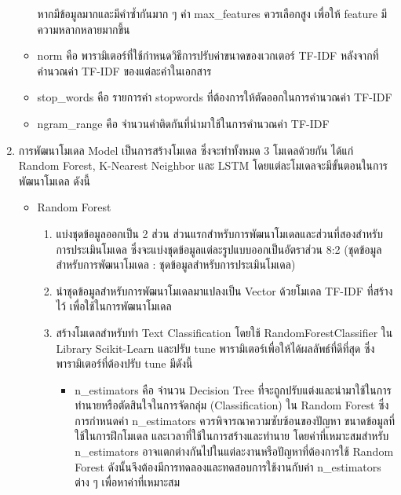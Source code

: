 \documentclass[12pt,oneside,openright,a4paper]{cpe-thai-project}
\begin{document}
\begin{enumerate}
\begin{itemize}
                  หากมีข้อมูลมากและมีคำซ้ำกันมาก ๆ ค่า max\_features ควรเลือกสูง เพื่อให้ feature มีความหลากหลายมากขึ้น
            \item norm คือ พารามิเตอร์ที่ใช้กำหนดวิธีการปรับค่าขนาดของเวกเตอร์ TF-IDF หลังจากที่คำนวณค่า TF-IDF ของแต่ละคำในเอกสาร
            \item stop\_words คือ รายการคำ stopwords ที่ต้องการให้ตัดออกในการคำนวณค่า TF-IDF
            \item ngram\_range คือ จำนวนคำติดกันที่นำมาใช้ในการคำนวณค่า TF-IDF
          \end{itemize}
    \item การพัฒนาโมเดล Model
          \newline\hspace*{1cm}เป็นการสร้างโมเดล ซึ่งจะทำทั้งหมด 3 โมเดลด้วยกัน ได้แก่ Random Forest, K-Nearest Neighbor และ LSTM
          โดยแต่ละโมเดลจะมีขั้นตอนในการพัฒนาโมเดล ดังนี้
          \begin{itemize}
            \item Random Forest
                  \begin{enumerate}
                    \item แบ่งชุดข้อมูลออกเป็น 2 ส่วน ส่วนแรกสำหรับการพัฒนาโมเดลและส่วนที่สองสำหรับการประเมินโมเดล 
                    ซึ่งจะแบ่งชุดข้อมูลแต่ละรูปแบบออกเป็นอัตราส่วน 8:2 (ชุดข้อมูลสำหรับการพัฒนาโมเดล : ชุดข้อมูลสำหรับการประเมินโมเดล) 
                    \item นำชุดข้อมูลสำหรับการพัฒนาโมเดลมาแปลงเป็น Vector ด้วยโมเดล TF-IDF ที่สร้างไว้ เพื่อใช้ในการพัฒนาโมเดล
                    \item สร้างโมเดลสำหรับทำ Text Classification โดยใช้ RandomForestClassifier ใน Library Scikit-Learn 
                          และปรับ tune พารามิเตอร์เพื่อให้ได้ผลลัพธ์ที่ดีที่สุด ซึ่งพารามิเตอร์ที่ต้องปรับ tune มีดังนี้
                          \begin{itemize}
                            \item n\_estimators คือ จำนวน Decision Tree ที่จะถูกปรับแต่งและนำมาใช้ในการทำนายหรือตัดสินใจในการจัดกลุ่ม (Classification) ใน Random Forest
                                  ซึ่งการกำหนดค่า n\_estimators ควรพิจารณาความซับซ้อนของปัญหา ขนาดข้อมูลที่ใช้ในการฝึกโมเดล และเวลาที่ใช้ในการสร้างและทำนาย 
                                  โดยค่าที่เหมาะสมสำหรับ n\_estimators อาจแตกต่างกันไปในแต่ละงานหรือปัญหาที่ต้องการใช้ Random Forest 
                                  ดังนั้นจึงต้องมีการทดลองและทดสอบการใช้งานกับค่า n\_estimators ต่าง ๆ เพื่อหาค่าที่เหมาะสม

\end{itemize}
\end{enumerate}
\end{itemize}
\end{enumerate}
\end{document}

